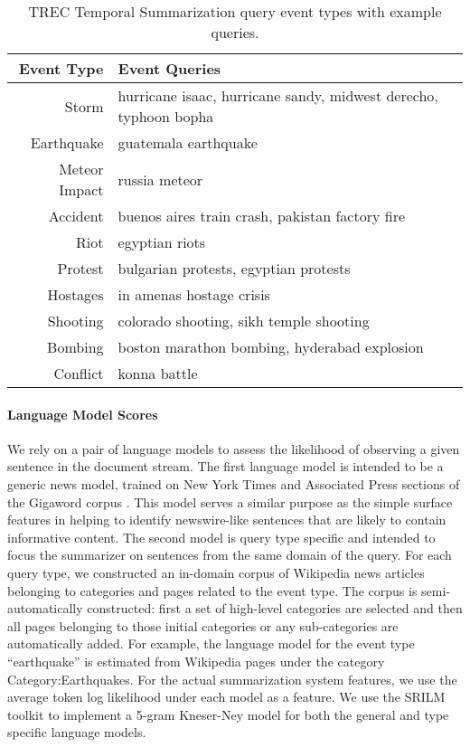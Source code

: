 \begin{table}
\begin{tabular}{r | l}
\textbf{Event Type} & \textbf{Event Queries} \\
\hline
Storm & hurricane isaac, hurricane sandy, midwest derecho, typhoon bopha\\
Earthquake & guatemala earthquake  \\
Meteor Impact & russia meteor \\
Accident & buenos aires train crash,  pakistan factory fire\\
Riot & egyptian riots\\
Protest & bulgarian protests, egyptian protests \\
Hostages & in amenas hostage crisis \\
Shooting & colorado shooting, sikh temple shooting\\
Bombing & boston marathon bombing, hyderabad explosion \\
Conflict & konna battle \\
\end{tabular}
\caption{TREC Temporal Summarization query event types with example queries.} 
\label{fig:eventtypes}
\end{table}

\paragraph{Language Model Scores}

We rely on a pair of language models to assess the likelihood of observing
a given sentence in the document stream. The first language model is 
intended to be a generic news model, trained on New York Times and 
Associated Press sections of the Gigaword corpus \citep{graff2003english}. 
This model serves a similar purpose as the simple surface features in helping
to identify newswire-like sentences that are likely to contain informative
content.
The second model is query type specific and intended to focus the summarizer
on sentences from the same domain of the query. For each query type, we 
constructed an in-domain corpus of Wikipedia news articles belonging to
categories and pages related to the event type. The corpus is 
semi-automatically constructed: first a set of high-level categories are 
selected and then all pages belonging to those initial categories or
any sub-categories are automatically added. 
For example, the language
model for the event type ``earthquake'' is estimated
from Wikipedia pages under the category Category:Earthquakes.
For the actual summarization system features, we use the average token log
likelihood under each model as a feature.
We use the SRILM toolkit \citep{stolke2002srilm} to implement a 5-gram 
Kneser-Ney model \citep{kneser1995improved} for both the general and type
specific language models. 

